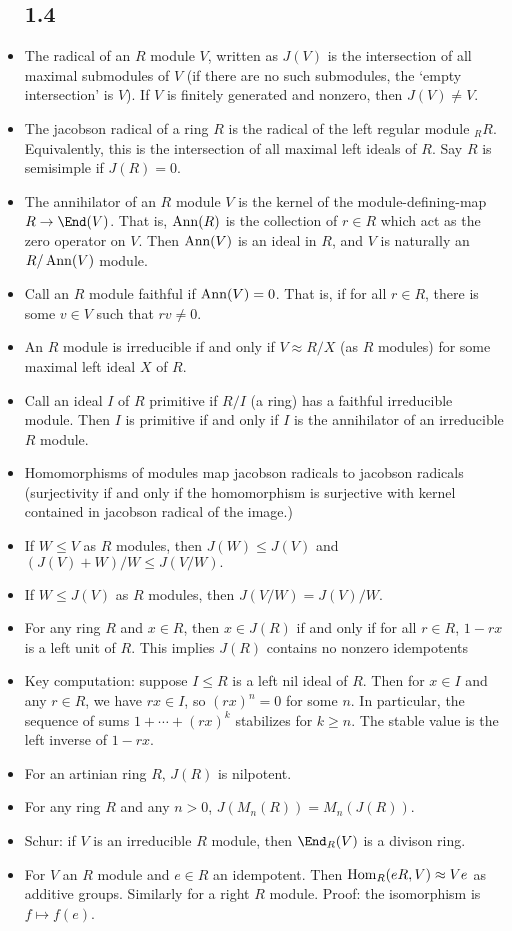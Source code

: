 \documentclass[11pt]{amsart}
\begin{document}
\begin{itemize}
  \subsection{1.4}
  \item The radical of an $R$ module $V$, written as $J(V)$ is the intersection of all maximal submodules of $V$ (if there are no such submodules, the `empty intersection' is $V$).  If $V$ is finitely generated and nonzero, then $J(V)\neq V$.
  \item The jacobson radical of a ring $R$ is the radical of the left regular module $_R R$. Equivalently, this is the intersection of all maximal left ideals of $R$.  Say $R$ is semisimple if $J(R)=0$. 
  \item The annihilator of an $R$ module $V$ is the kernel of the module-defining-map $R \to \End(V)$. That is, $\operatorname{Ann}(R)$ is the collection of $r\in R$ which act as the zero operator on $V$. Then $\operatorname{Ann}(V)$ is an ideal in $R$, and $V$ is naturally an $R/\operatorname{Ann}(V)$ module.  
  \item Call an $R$ module faithful if $\operatorname{Ann}(V)=0$. That is, if for all $r \in R$, there is some $v \in V$ such that $rv\neq 0$. 
  \item An $R$ module is irreducible if and only if $V \approx R/X$ (as $R$ modules) for some maximal left ideal $X$ of $R$. 
  \item Call an ideal $I$ of $R$ primitive if $R/I$ (a ring) has a faithful irreducible module. Then $I$ is primitive if and only if $I$ is the annihilator of an irreducible $R$ module.
  \item Homomorphisms of modules map jacobson radicals to jacobson radicals (surjectivity if and only if the homomorphism is surjective with kernel contained in jacobson radical of the image.) 
  \item If $W \leq V$ as $R$ modules, then $J(W) \leq J(V)$ and $(J(V)+W)/W \leq J(V/W). $
  \item If $W \leq J(V)$ as $R$ modules, then $J(V/W) = J(V)/W$.
  \item For any ring $R$ and $x\in R$, then $x\in J(R)$ if and only if for all $r\in R$, $1-rx$ is a left unit of $R$. This implies $J(R)$ contains no nonzero idempotents
  \item Key computation: suppose $I \leq R$ is a left nil ideal of $R$. Then for $x\in I$ and any $r\in R$, we have $rx\in I$, so $(rx)^n=0$ for some $n$. In particular, the sequence of sums $1+\cdots+ (rx)^k$ stabilizes for $k\geq n$. The stable value is the left inverse of $1-rx$. 
  \item For an artinian ring $R$, $J(R)$ is nilpotent. 
  \item For any ring $R$ and any $n>0$, $J(M_n(R))=M_n(J(R))$.
  \item Schur: if $V$ is an irreducible $R$ module, then $\End_R(V)$ is a divison ring. 
  \item For $V$ an $R$ module and $e\in R$ an idempotent. Then $\operatorname{Hom}_R(eR,V) \approx Ve$ as additive groups. Similarly for a right $R$ module. Proof: the isomorphism is $f \mapsto f(e)$. 

\end{itemize}
\end{document}
